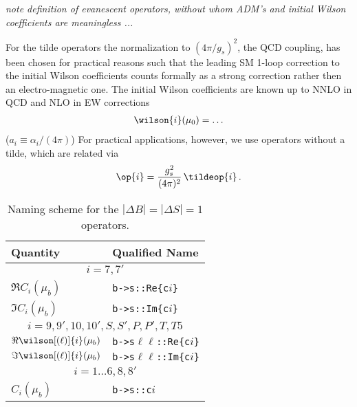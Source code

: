 {\em note definition of evanescent operators, without whom ADM's and initial Wilson 
coefficients are meaningless ...} 

For the tilde operators the normalization to $(4\pi/g_s)^2$, the QCD coupling, has been chosen
for practical reasons such that the leading SM 1-loop correction to the initial Wilson coefficients
counts formally as a strong correction rather then an electro-magnetic one. The 
initial Wilson coefficients are known up to NNLO in QCD and NLO in EW corrections
\begin{align}
  \wilson{i}(\mu_0) = \dots
\end{align}
($a_i \equiv \alpha_i/(4\pi)$)
For practical applications, however, we use operators without a tilde, which are related via
\begin{align}
    \op{i} = \frac{g_s^2}{(4\pi)^2}\, \tildeop{i}\,.
\end{align}

\begin{table}[t]
\begin{center}
\begin{tabular}{@{} p{.25\linewidth} p{.25\linewidth} @{}}
\toprule
    \textbf{Quantity} & \textbf{Qualified Name}\\
\midrule
    \multicolumn{2}{c}{$i=7,7'$}\\
\midrule
    $\Re C_i(\mu_b)$                 & \verb|b->s::Re{c|$i$\verb|}|\\
    $\Im C_i(\mu_b)$                 & \verb|b->s::Im{c|$i$\verb|}|\\
\midrule
    \multicolumn{2}{c}{$i=9,9',10,10',S,S',P,P',T,T5$}\\
\midrule
    $\Re \wilson[(\ell)]{i}(\mu_b)$  & \verb|b->s|$\ell\ell$\verb|::Re{c|$i$\verb|}|\\
    $\Im \wilson[(\ell)]{i}(\mu_b)$  & \verb|b->s|$\ell\ell$\verb|::Im{c|$i$\verb|}|\\
\midrule
    \multicolumn{2}{c}{$i=1\dots 6, 8,8'$}\\
\midrule
    $C_i(\mu_b)$                   & \verb|b->s::c|$i$\\
\bottomrule
\end{tabular}
\end{center}
\caption{Naming scheme for the $|\Delta B| = |\Delta S| = 1$ operators.}
\label{tab:eft:bsll:naming}
\end{table}

